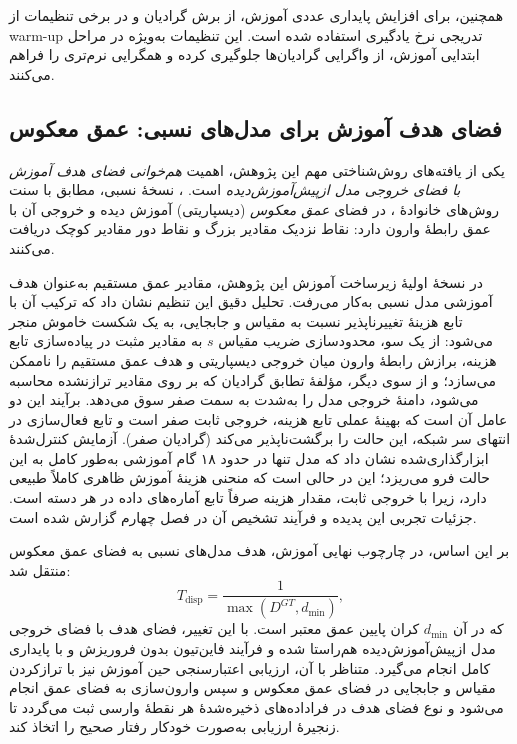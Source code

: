 همچنین، برای افزایش پایداری عددی آموزش، از برش گرادیان و در برخی تنظیمات از warm-up تدریجی نرخ یادگیری استفاده شده است. این تنظیمات به‌ویژه در مراحل ابتدایی آموزش، از واگرایی گرادیان‌ها جلوگیری کرده و همگرایی نرم‌تری را فراهم می‌کنند.

\subsection{فضای هدف آموزش برای مدل‌های نسبی: عمق معکوس}
\label{subsec:disparity_target_space}

یکی از یافته‌های روش‌شناختی مهم این پژوهش، اهمیت \emph{هم‌خوانی فضای هدف آموزش با فضای خروجی مدل ازپیش‌آموزش‌دیده} است. \basemodel{}، نسخهٔ نسبی، مطابق با سنت روش‌های خانوادهٔ  \cite{Ranftl2019Robust}، در فضای \emph{عمق معکوس} (دیسپاریتی) آموزش دیده و خروجی آن با عمق رابطهٔ وارون دارد: نقاط نزدیک مقادیر بزرگ و نقاط دور مقادیر کوچک دریافت می‌کنند.

در نسخهٔ اولیهٔ زیرساخت آموزش این پژوهش، مقادیر عمق مستقیم به‌عنوان هدف آموزشی مدل نسبی به‌کار می‌رفت. تحلیل دقیق این تنظیم نشان داد که ترکیب آن با تابع هزینهٔ تغییرناپذیر نسبت به مقیاس و جابجایی، به یک شکست خاموش منجر می‌شود: از یک سو، محدودسازی ضریب مقیاس $s$ به مقادیر مثبت در پیاده‌سازی تابع هزینه، برازش رابطهٔ وارون میان خروجی دیسپاریتی و هدف عمق مستقیم را ناممکن می‌سازد؛ و از سوی دیگر، مؤلفهٔ تطابق گرادیان که بر روی مقادیر تراز‌نشده محاسبه می‌شود، دامنهٔ خروجی مدل را به‌شدت به سمت صفر سوق می‌دهد. برآیند این دو عامل آن است که بهینهٔ عملی تابع هزینه، خروجی ثابت صفر است و تابع فعال‌سازی  در انتهای سر شبکه، این حالت را برگشت‌ناپذیر می‌کند (گرادیان صفر). آزمایش کنترل‌شدهٔ ابزارگذاری‌شده نشان داد که مدل  تنها در حدود ۱۸ گام آموزشی به‌طور کامل به این حالت فرو می‌ریزد؛ این در حالی است که منحنی هزینهٔ آموزش ظاهری کاملاً طبیعی دارد، زیرا با خروجی ثابت، مقدار هزینه صرفاً تابع آماره‌های داده در هر دسته است. جزئیات تجربی این پدیده و فرآیند تشخیص آن در فصل چهارم گزارش شده است.

بر این اساس، در چارچوب نهایی آموزش، هدف مدل‌های نسبی به فضای عمق معکوس منتقل شد:
\begin{equation}
T_{\mathrm{disp}} = \frac{1}{\max(D^{GT}, d_{\min})},
\end{equation}
که در آن $d_{\min}$ کران پایین عمق معتبر است. با این تغییر، فضای هدف با فضای خروجی مدل ازپیش‌آموزش‌دیده هم‌راستا شده و فرآیند فاین‌تیون بدون فروریزش و با پایداری کامل انجام می‌گیرد. متناظر با آن، ارزیابی اعتبارسنجی حین آموزش نیز با ترازکردن مقیاس و جابجایی در فضای عمق معکوس و سپس وارون‌سازی به فضای عمق انجام می‌شود و نوع فضای هدف در فراداده‌های ذخیره‌شدهٔ هر نقطهٔ وارسی ثبت می‌گردد تا زنجیرهٔ ارزیابی به‌صورت خودکار رفتار صحیح را اتخاذ کند.

